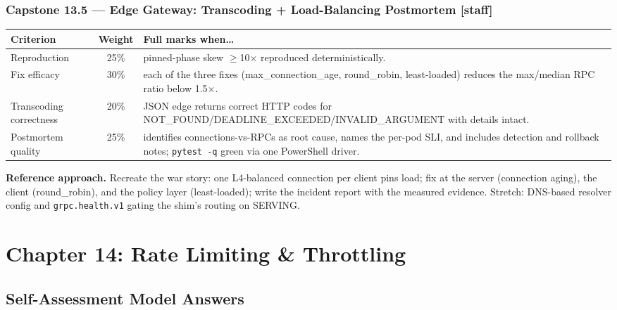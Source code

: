 \subsubsection*{Capstone 13.5 --- Edge Gateway: Transcoding + Load-Balancing Postmortem [staff]}
\begin{center}\small
\begin{tabularx}{\textwidth}{l c X}
\toprule
\textbf{Criterion} & \textbf{Weight} & \textbf{Full marks when\ldots} \\
\midrule
Reproduction & 25\% & pinned-phase skew $\geq$10$\times$ reproduced deterministically. \\
Fix efficacy & 30\% & each of the three fixes (max\_connection\_age, round\_robin, least-loaded) reduces the max/median RPC ratio below 1.5$\times$. \\
Transcoding correctness & 20\% & JSON edge returns correct HTTP codes for NOT\_FOUND/DEADLINE\_EXCEEDED/INVALID\_ARGUMENT with details intact. \\
Postmortem quality & 25\% & identifies connections-vs-RPCs as root cause, names the per-pod SLI, and includes detection and rollback notes; \texttt{pytest -q} green via one PowerShell driver. \\
\bottomrule
\end{tabularx}
\end{center}
\textbf{Reference approach.} Recreate the war story: one L4-balanced
connection per client pins load; fix at the server (connection aging), the
client (round\_robin), and the policy layer (least-loaded); write the
incident report with the measured evidence. Stretch: DNS-based resolver
config and \texttt{grpc.health.v1} gating the shim's routing on SERVING.

\section{Chapter 14: Rate Limiting \& Throttling}
\label{sec:sol-ch14}

\subsection{Self-Assessment Model Answers}

